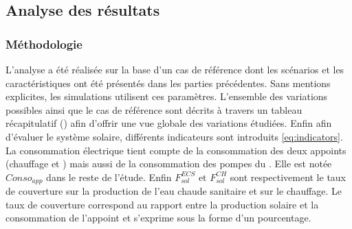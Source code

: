 \subsection{Analyse des résultats} %
\label{sub:analyse_des_resultats}
\subsubsection{Méthodologie} %
\label{ssub:methodologie}
L’analyse a été réalisée sur la base d’un cas de référence dont les scénarios et les
caractéristiques ont été présentés dans les parties précédentes. Sans mentions explicites, les
simulations utilisent ces paramètres. L’ensemble des variations possibles ainsi que
le cas de référence sont décrits à travers un tableau récapitulatif ()
afin d’offrir une vue globale des variations étudiées.
Enfin afin d’évaluer le système solaire, différents indicateurs sont introduits
\eqref{eq:indicators}. La consommation électrique tient compte de la consommation des deux
appoints (chauffage et ) mais aussi de la consommation des pompes du . Elle est
notée $Conso_{app}$ dans le reste de l’étude. Enfin $F_{sol}^{ECS}$ et $F_{sol}^{CH}$
sont respectivement le taux de couverture sur la production de l’eau chaude sanitaire
et sur le chauffage. Le taux de couverture correspond au rapport entre la production
solaire et la consommation de l’appoint et s’exprime sous la forme d’un pourcentage.



